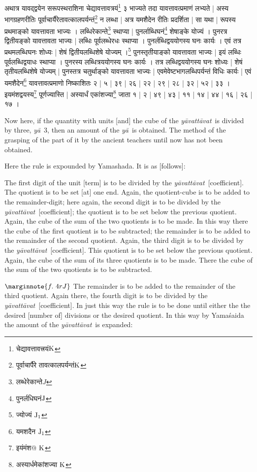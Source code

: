 \documentclass[11pt,a5paper]{book}
\def\yavattavat{\textit{y\=avatt\=avat}}
\def\ya{\textit{y\=a}}
\begin{document}
{\newpage 
{\s अथात्र यावद्द्वयेन सरूपस्थराशिना
चेद्यावत्तावत्रयं\footnote{{\s चेद्यावत्तावत्त्रयं}${\rm K}$}
३ भाज्यते
तदा यावत्तावत्प्रमाणं लभ्यते |
अस्य भागग्रहणरीतिः पूर्वाचार्यैरेतावत्कालपर्यन्तं\footnote{{\s पूर्वाचार्पैरे तावत्कालपर्यन्तं}${\rm K}$}
न लब्धा |
अत्र यमशैदेन रीतिः प्रदर्शिता | 
सा यथा | 
रूपस्य प्रथमाङ्को यावत्तावता भाज्यः । लब्धिरेकान्ते\footnote{{\s लब्धेरेकान्ते}$J$}
स्थाप्या | 
पुनर्लाब्धिघनं\footnote{{\s पुनर्लधिघनं}${\rm J}$} शेषाङ्के योज्यं । पुनरत्र
द्वितीयङ्को 
यावत्तावता भाज्यः |
लब्धिः पूर्वलब्धेरधः स्थाप्या । 
पुनर्लब्धिद्वययोगस्य घनः कार्यः । 
एवं तत्र प्रथमलब्धिघनः शोध्यः | 
शेषं द्वितीयलब्धिशेषे योज्यम् ।\footnote{{\s ज्योज्यं }${\rm J_1}$}
पुनस्तृतीयाङ्को यावत्तावता भाज्यः | 
इयं लब्धिः पूर्वलब्धिद्वयाधः स्थाप्या । 
पुनरस्य लब्धित्रययोगस्य घनः कार्यः । 
तत्र लब्धिद्वययोगस्य घनः शोध्यः | 
शेषं तृतीयलब्धिशेषे योज्यम् | 
पुनस्तत्र चतुर्थाङ्को यावत्तावता भाज्यः | 
एवमेवेष्टभागलब्धिपर्यन्तं विधिः कार्यः | 
एवं यमशैदेन\footnote{{\s यमशदैन }${\rm J_1}$}
यावत्तावत्प्रमाणो निष्काशितः २ | ५ | ३९ | २६ | २२ | २९ | २८ | ३२ | ५२ | ३३ ।
इयमंशद्वयस्य\footnote{{\s इयंमंश@ }${\rm K}$}
पूर्णज्यास्ति | 
अस्यार्धं एकांशज्या\footnote{{\s अस्यार्धमेकांशज्या }${\rm K}$} जाता १ | २ | ४९ | ४३ | ११ | १४ | ४४ | १६ | २६ | १७ । }


\newpage 
Now here, if the quantity with units [and] the cube of the \yavattavat\ is divided by three, \ya\ 3, 
then an amount of the \ya\ is obtained.    
The method of the grasping of the part of it 
by the ancient teachers until now has not been obtained.

Here the rule is expounded by Yamashada. It is as [follows]:

The first digit of the unit [term] is to be divided by the \yavattavat\ [coefficient]. The quotient is to be set
[at] one end. Again, the quotient-cube is to be added to the remainder-digit;
here again, the second digit is to be divided by the \yavattavat\ [coefficient]; the quotient is to be set
below the previous quotient. Again, the cube of the sum of the two quotients
is to be made.  In this way there the cube of the first quotient is to be subtracted;
the remainder is to be added to the remainder of the second quotient. Again, the third digit is to be
divided by the \yavattavat\ [coefficient]. This quotient is to be set below the previous quotient. Again,
the cube of the sum of its three quotients is to be made. There the cube of
the sum of the two quotients is to be subtracted. 

$\marginnote{f.~4r J}$
The remainder is to be added to the remainder of the third quotient. Again there, the 
fourth digit is to be divided by the \yavattavat\ [coefficient]. In just this way the rule is to be done until either the the desired [number of] divisions or the desired quotient. In this way by Yama\'saida the amount of the \yavattavat\ is 
expanded:

}
\end{document}
